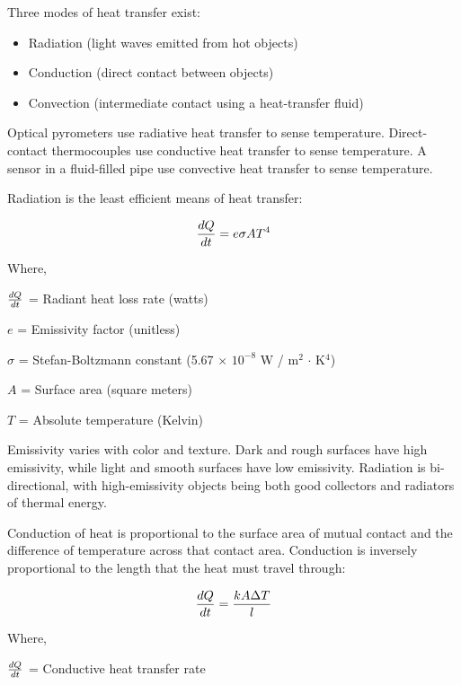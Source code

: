 





Three modes of heat transfer exist:

\begin{itemize}
\item{} Radiation (light waves emitted from hot objects)
\item{} Conduction (direct contact between objects)
\item{} Convection (intermediate contact using a heat-transfer fluid)
\end{itemize}

Optical pyrometers use radiative heat transfer to sense temperature.  Direct-contact thermocouples use conductive heat transfer to sense temperature.  A sensor in a fluid-filled pipe use convective heat transfer to sense temperature.

\vskip 10pt

Radiation is the least efficient means of heat transfer:

$${dQ \over dt} = e \sigma A T^4$$

\noindent
Where,

$dQ \over dt$ = Radiant heat loss rate (watts)

$e$ = Emissivity factor (unitless)

$\sigma$ = Stefan-Boltzmann constant (5.67 $\times$ $10^{-8}$ W / m$^{2}$ $\cdot$ K$^{4}$)

$A$ = Surface area (square meters)

$T$ = Absolute temperature (Kelvin)

\vskip 10pt

Emissivity varies with color and texture.  Dark and rough surfaces have high emissivity, while light and smooth surfaces have low emissivity.  Radiation is bi-directional, with high-emissivity objects being both good collectors and radiators of thermal energy.

\vskip 10pt

Conduction of heat is proportional to the surface area of mutual contact and the difference of temperature across that contact area.  Conduction is inversely proportional to the length that the heat must travel through:

$${dQ \over dt} = {kA {\Delta T} \over l}$$

\noindent
Where,

$dQ \over dt$ = Conductive heat transfer rate

